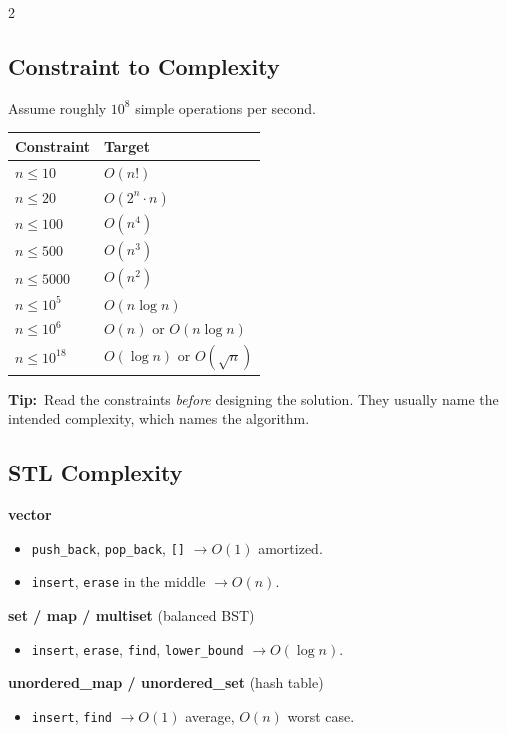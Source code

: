 \documentclass[10pt]{article}
\newcommand{\code}[1]{\texttt{\small #1}}
\newcommand{\tip}[1]{{\color{tipc}\footnotesize\textbf{Tip:}}~{\footnotesize #1}\par}
\begin{document}
\begin{multicols}{2}
\subsection{Constraint to Complexity}
Assume roughly $10^8$ simple operations per second.
\begin{center}\footnotesize
\begin{tabular}{@{}ll@{}}
\toprule
\textbf{Constraint} & \textbf{Target} \\
\midrule
$n \le 10$        & $O(n!)$ \\
$n \le 20$        & $O(2^n \cdot n)$ \\
$n \le 100$       & $O(n^4)$ \\
$n \le 500$       & $O(n^3)$ \\
$n \le 5000$      & $O(n^2)$ \\
$n \le 10^5$      & $O(n \log n)$ \\
$n \le 10^6$      & $O(n)$ or $O(n \log n)$ \\
$n \le 10^{18}$   & $O(\log n)$ or $O(\sqrt n)$ \\
\bottomrule
\end{tabular}
\end{center}
\tip{Read the constraints \emph{before} designing the solution. They
usually name the intended complexity, which names the algorithm.}

\subsection{STL Complexity}
\textbf{vector}
\begin{itemize}
    \item \code{push\_back}, \code{pop\_back}, \code{[]} $\rightarrow O(1)$
          amortized.
    \item \code{insert}, \code{erase} in the middle $\rightarrow O(n)$.
\end{itemize}

\textbf{set / map / multiset} (balanced BST)
\begin{itemize}
    \item \code{insert}, \code{erase}, \code{find},
          \code{lower\_bound} $\rightarrow O(\log n)$.
\end{itemize}

\textbf{unordered\_map / unordered\_set} (hash table)
\begin{itemize}
    \item \code{insert}, \code{find} $\rightarrow O(1)$ average,
          $O(n)$ worst case.
\end{itemize}


\end{multicols}
\end{document}
